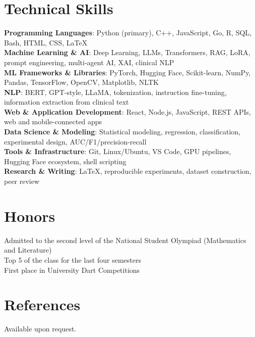 \documentclass[letterpaper,11pt]{article}
\begin{document}
%
\section{Technical Skills}
  \begin{itemize}[leftmargin=0.15in, label={}]
    \small{\item{
     \textbf{Programming Languages}{:} Python (primary), C++, JavaScript, Go, R, SQL, Bash, HTML, CSS, \LaTeX \\
     \textbf{Machine Learning \& AI}{:} Deep Learning, LLMs, Transformers, RAG, LoRA, prompt engineering, multi-agent AI, XAI, clinical NLP \\
     \textbf{ML Frameworks \& Libraries}{:} PyTorch, Hugging Face, Scikit-learn, NumPy, Pandas, TensorFlow, OpenCV, Matplotlib, NLTK \\
     \textbf{NLP}{:} BERT, GPT-style, LLaMA, tokenization, instruction fine-tuning, information extraction from clinical text \\
     \textbf{Web \& Application Development}{:} React, Node.js, JavaScript, REST APIs, web and mobile-connected apps \\
     \textbf{Data Science \& Modeling}{:} Statistical modeling, regression, classification, experimental design, AUC/F1/precision-recall \\
     \textbf{Tools \& Infrastructure}{:} Git, Linux/Ubuntu, VS Code, GPU pipelines, Hugging Face ecosystem, shell scripting \\
     \textbf{Research \& Writing}{:} LaTeX, reproducible experiments, dataset construction, peer review
    }}
  \end{itemize}


\section{Honors}
  \begin{itemize}[leftmargin=0.15in, label={}]
    \small{\item{
     Admitted to the second level of the National Student Olympiad (Mathematics and Literature) \\
     Top 5 of the class for the last four semesters \\
     First place in University Dart Competitions
    }}
  \end{itemize}


\section{References}
  \begin{itemize}[leftmargin=0.15in, label={}]
    \small{\item{Available upon request.}}
  \end{itemize}


\end{document}
